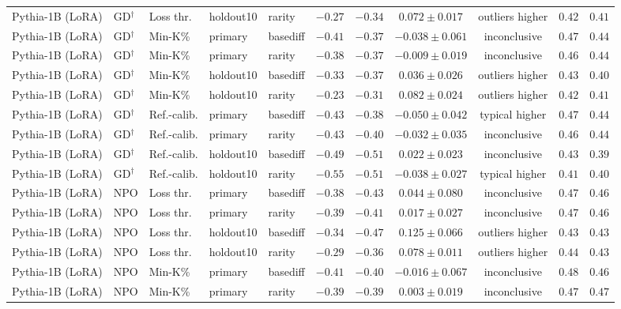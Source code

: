 {\begin{longtable}{@{\extracolsep{\fill}}lllllcccccc@{}}
Pythia-1B (LoRA) & GD$^{\dagger}$ & Loss thr. & holdout10 & rarity & $-0.27$ & $-0.34$ & $0.072 \pm 0.017$ & outliers higher & $0.42$ & $0.41$ \\
Pythia-1B (LoRA) & GD$^{\dagger}$ & Min-K\% & primary & basediff & $-0.41$ & $-0.37$ & $-0.038 \pm 0.061$ & inconclusive & $0.47$ & $0.44$ \\
Pythia-1B (LoRA) & GD$^{\dagger}$ & Min-K\% & primary & rarity & $-0.38$ & $-0.37$ & $-0.009 \pm 0.019$ & inconclusive & $0.46$ & $0.44$ \\
Pythia-1B (LoRA) & GD$^{\dagger}$ & Min-K\% & holdout10 & basediff & $-0.33$ & $-0.37$ & $0.036 \pm 0.026$ & outliers higher & $0.43$ & $0.40$ \\
Pythia-1B (LoRA) & GD$^{\dagger}$ & Min-K\% & holdout10 & rarity & $-0.23$ & $-0.31$ & $0.082 \pm 0.024$ & outliers higher & $0.42$ & $0.41$ \\
Pythia-1B (LoRA) & GD$^{\dagger}$ & Ref.-calib. & primary & basediff & $-0.43$ & $-0.38$ & $-0.050 \pm 0.042$ & typical higher & $0.47$ & $0.44$ \\
Pythia-1B (LoRA) & GD$^{\dagger}$ & Ref.-calib. & primary & rarity & $-0.43$ & $-0.40$ & $-0.032 \pm 0.035$ & inconclusive & $0.46$ & $0.44$ \\
Pythia-1B (LoRA) & GD$^{\dagger}$ & Ref.-calib. & holdout10 & basediff & $-0.49$ & $-0.51$ & $0.022 \pm 0.023$ & inconclusive & $0.43$ & $0.39$ \\
Pythia-1B (LoRA) & GD$^{\dagger}$ & Ref.-calib. & holdout10 & rarity & $-0.55$ & $-0.51$ & $-0.038 \pm 0.027$ & typical higher & $0.41$ & $0.40$ \\
Pythia-1B (LoRA) & NPO & Loss thr. & primary & basediff & $-0.38$ & $-0.43$ & $0.044 \pm 0.080$ & inconclusive & $0.47$ & $0.46$ \\
Pythia-1B (LoRA) & NPO & Loss thr. & primary & rarity & $-0.39$ & $-0.41$ & $0.017 \pm 0.027$ & inconclusive & $0.47$ & $0.46$ \\
Pythia-1B (LoRA) & NPO & Loss thr. & holdout10 & basediff & $-0.34$ & $-0.47$ & $0.125 \pm 0.066$ & outliers higher & $0.43$ & $0.43$ \\
Pythia-1B (LoRA) & NPO & Loss thr. & holdout10 & rarity & $-0.29$ & $-0.36$ & $0.078 \pm 0.011$ & outliers higher & $0.44$ & $0.43$ \\
Pythia-1B (LoRA) & NPO & Min-K\% & primary & basediff & $-0.41$ & $-0.40$ & $-0.016 \pm 0.067$ & inconclusive & $0.48$ & $0.46$ \\
Pythia-1B (LoRA) & NPO & Min-K\% & primary & rarity & $-0.39$ & $-0.39$ & $0.003 \pm 0.019$ & inconclusive & $0.47$ & $0.47$ \\

\end{longtable}}

